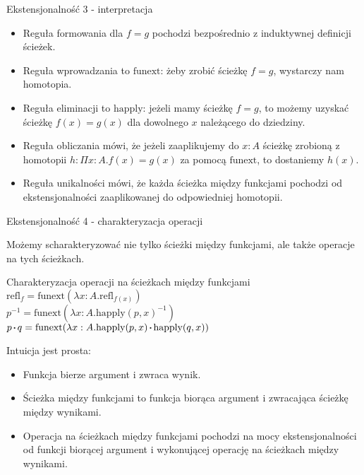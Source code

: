 \documentclass{beamer}
\newcommand{\refl}[1]{\text{refl}_{#1}}
\newcommand{\inv}[1]{#1^{-1}}
\newcommand{\sq}{\mathbin{\vcenter{\hbox{\rule{.3ex}{.3ex}}}}}
\newcommand{\happly}{\text{happly}}
\newcommand{\funext}{\text{funext}}
\begin{document}
\begin{frame}{Ekstensjonalność 3 - interpretacja}
\begin{itemize}
	\item Reguła formowania dla $f = g$ pochodzi bezpośrednio z induktywnej definicji ścieżek.
	\item Reguła wprowadzania to $\funext$: żeby zrobić ścieżkę $f = g$, wystarczy nam homotopia.
	\item Reguła eliminacji to $\happly$: jeżeli mamy ścieżkę $f = g$, to możemy uzyskać ścieżkę $f(x) = g(x)$ dla dowolnego $x$ należącego do dziedziny.
	\item Reguła obliczania mówi, że jeżeli zaaplikujemy do $x : A$ ścieżkę zrobioną z homotopii $h : \Pi x : A. f(x) = g(x)$ za pomocą $\funext$, to dostaniemy $h(x)$.
	\item Reguła unikalności mówi, że każda ścieżka między funkcjami pochodzi od ekstensjonalności zaaplikowanej do odpowiedniej homotopii.
\end{itemize}
\end{frame}

\begin{frame}{Ekstensjonalność 4 - charakteryzacja operacji}

Możemy scharakteryzować nie tylko ścieżki między funkcjami, ale także operacje na tych ścieżkach.

\begin{block}{Charakteryzacja operacji na ścieżkach między funkcjami}
$\refl{f} = \funext(\lambda x : A. \refl{f(x)})$ \\

$\inv{p} = \funext(\lambda x : A.\inv{\happly(p, x)})$ \\

$p \sq q = \funext(\lambda x : A. \happly(p, x) \sq \happly(q, x))$
\end{block}

Intuicja jest prosta:
\begin{itemize}
	\item Funkcja bierze argument i zwraca wynik.
	\item Ścieżka między funkcjami to funkcja biorąca argument i zwracająca ścieżkę między wynikami.
	\item Operacja na ścieżkach między funkcjami pochodzi na mocy ekstensjonalności od funkcji biorącej argument i wykonującej operację na ścieżkach między wynikami.
\end{itemize}

\end{frame}
\end{document}
